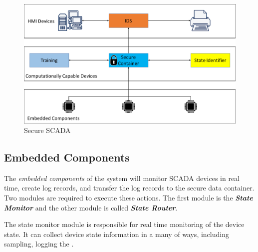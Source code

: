 \documentclass[conference]{IEEEtran}
\begin{document}
\begin{figure}[htbp]
\centering
\centerline{\includegraphics [width=.5\textwidth]{sec_scada.png}}
\caption{Secure SCADA}
\label{Sec_scada}
%
\end{figure}

\subsection{Embedded Components}
The {\em embedded components} of the system will monitor SCADA devices in real time, create log records, and transfer the log records to the secure data container. Two modules are required to execute these actions. The first module is the \textit{\textbf{State Monitor}} and the other module is called \textit{\textbf{State Router}}.

The state monitor module is responsible for real time monitoring of the device state. It can collect device state information in a many of ways, including sampling, logging the .
\end{document}
